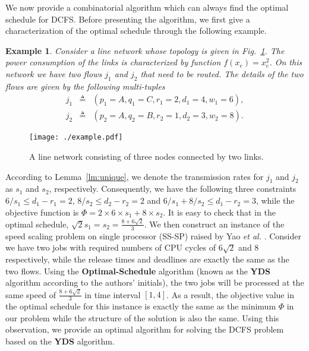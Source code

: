 \documentclass[10pt, conference, compsocconf]{IEEEtran}
\newtheorem{example}{Example}
\begin{document}
We now provide a combinatorial algorithm which can always find the optimal schedule for DCFS. Before presenting the algorithm, we first give a characterization of the optimal schedule through the following example.
\begin{example}
Consider a line network whose topology is given in Fig.~\ref{fig:example_1}. The power consumption of the links is characterized by function $f(x_e) = x_e^2$. On this network we have two flows $j_1$ and $j_2$ that need to be routed. The details of the two flows are given by the following multi-tuples
\begin{eqnarray}
j_1 &\triangleq & (p_1=A,q_1=C,r_1=2,d_1=4,w_1=6), \nonumber\\
j_2 &\triangleq & (p_2=A,q_2=B,r_2=1,d_2=3,w_2=8). \nonumber
\end{eqnarray}
\end{example}
\begin{figure}[t!]
\centering
\texttt{[image: ./example.pdf]}
\caption{\label{fig:example_1} A line network consisting of three nodes connected by two links. }
\end{figure}
According to Lemma~\ref{lm:unique}, we denote the transmission rates for $j_1$ and $j_2$ as $s_1$ and $s_2$, respectively. Consequently, we have the following three constraints $6/s_1 \leq d_1 - r_1 = 2$, $8/s_2 \leq d_2-r_2=2$ and $6/s_1 + 8/s_2 \leq d_1 - r_2=3$, while the objective function is $\Phi=2 \times 6\times s_1 + 8\times s_2$. It is easy to check that in the optimal schedule, $\sqrt{2} s_1 = s_2 = \frac{8+6\sqrt{2}}{3}$. We then construct an instance of the speed scaling problem on single processor (SS-SP) raised by Yao \emph{et al.} \cite{Yao_Demers_Shenker-YDS-1995}. Consider we have two jobs with required numbers of CPU cycles of $6\sqrt{2}$ and $8$ respectively, while the release times and deadlines are exactly the same as the two flows. Using the \textbf{Optimal-Schedule} algorithm (known as the \textbf{YDS} algorithm according to the authors' initials), the two jobs will be processed at the same speed of $\frac{8+6\sqrt{2}}{3}$ in time interval $[1,4]$. As a result, the objective value in the optimal schedule for this instance is exactly the same as the minimum $\Phi$ in our problem while the structure of the solution is also the same. Using this observation, we provide an optimal algorithm for solving the DCFS problem based on the \textbf{YDS} algorithm. 
\end{document}
